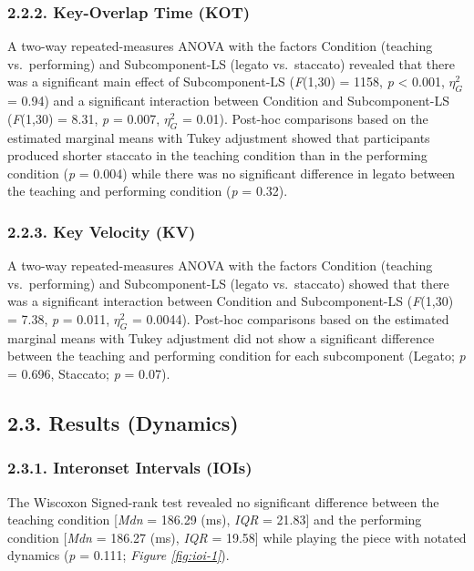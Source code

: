 \documentclass[
  english,
  man,floatsintext]{apa6}
\begin{document}
\hypertarget{key-overlap-time-kot}{%
\subsubsection{2.2.2. Key-Overlap Time (KOT)}\label{key-overlap-time-kot}}

A two-way repeated-measures ANOVA with the factors Condition (teaching vs.~performing) and Subcomponent-LS (legato vs.~staccato) revealed that there was a significant main effect of Subcomponent-LS (\emph{F}(1,30) = 1158, \emph{p} \textless{} 0.001, \(\eta_G^2\) = 0.94) and a significant interaction between Condition and Subcomponent-LS (\emph{F}(1,30) = 8.31, \emph{p} = 0.007, \(\eta_G^2\) = 0.01). Post-hoc comparisons based on the estimated marginal means with Tukey adjustment showed that participants produced shorter staccato in the teaching condition than in the performing condition (\emph{p} = 0.004) while there was no significant difference in legato between the teaching and performing condition (\emph{p} = 0.32).

\hypertarget{key-velocity-kv}{%
\subsubsection{2.2.3. Key Velocity (KV)}\label{key-velocity-kv}}

A two-way repeated-measures ANOVA with the factors Condition (teaching vs.~performing) and Subcomponent-LS (legato vs.~staccato) showed that there was a significant interaction between Condition and Subcomponent-LS (\emph{F}(1,30) = 7.38, \emph{p} = 0.011, \(\eta_G^2\) = 0.0044). Post-hoc comparisons based on the estimated marginal means with Tukey adjustment did not show a significant difference between the teaching and performing condition for each subcomponent (Legato; \emph{p} = 0.696, Staccato; \emph{p} = 0.07).

\hypertarget{results-dynamics}{%
\subsection{2.3. Results (Dynamics)}\label{results-dynamics}}

\hypertarget{interonset-intervals-iois-1}{%
\subsubsection{2.3.1. Interonset Intervals (IOIs)}\label{interonset-intervals-iois-1}}

The Wiscoxon Signed-rank test revealed no significant difference between the teaching condition {[}\emph{Mdn} = 186.29 (ms), \emph{IQR} = 21.83{]} and the performing condition {[}\emph{Mdn} = 186.27 (ms), \emph{IQR} = 19.58{]} while playing the piece with notated dynamics (\emph{p} = 0.111; \emph{Figure \ref{fig:ioi-1}}).
\end{document}

